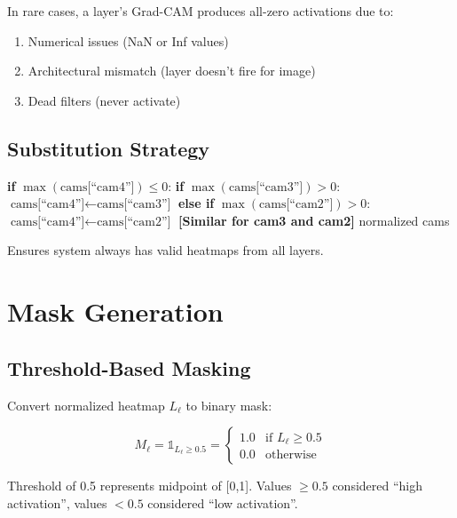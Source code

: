 \documentclass[12pt,a4paper,oneside]{book}
\begin{document}
In rare cases, a layer's Grad-CAM produces all-zero activations due to:
\begin{enumerate}
  \item Numerical issues (NaN or Inf values)
  \item Architectural mismatch (layer doesn't fire for image)
  \item Dead filters (never activate)
\end{enumerate}

\subsection{Substitution Strategy}

\begin{algorithm}[H]
\caption{Dead CAM Substitution}
\begin{algorithmic}[1]
  \State \textbf{if} $\max(\text{cams[``cam4'']}) \leq 0$:
  \State \quad \textbf{if} $\max(\text{cams[``cam3'']}) > 0$:
  \State \quad\quad $\text{cams[``cam4'']} \gets \text{cams[``cam3'']}$
  \State \quad \textbf{else if} $\max(\text{cams[``cam2'']}) > 0$:
  \State \quad\quad $\text{cams[``cam4'']} \gets \text{cams[``cam2'']}$
  \State
  \State \textbf{[Similar for cam3 and cam2]}
  \State
  \Return normalized cams
\EndProcedure
\end{algorithmic}
\end{algorithm}

Ensures system always has valid heatmaps from all layers.

\section{Mask Generation}

\subsection{Threshold-Based Masking}

Convert normalized heatmap $L_\ell$ to binary mask:

\begin{equation}
M_\ell = \mathbb{1}_{L_\ell \geq 0.5} = \begin{cases}
1.0 & \text{if } L_\ell \geq 0.5 \\
0.0 & \text{otherwise}
\end{cases}
\label{eq:binary_mask}
\end{equation}

Threshold of 0.5 represents midpoint of [0,1]. Values $\geq 0.5$ considered ``high activation'', values $< 0.5$ considered ``low activation''.
\end{document}
